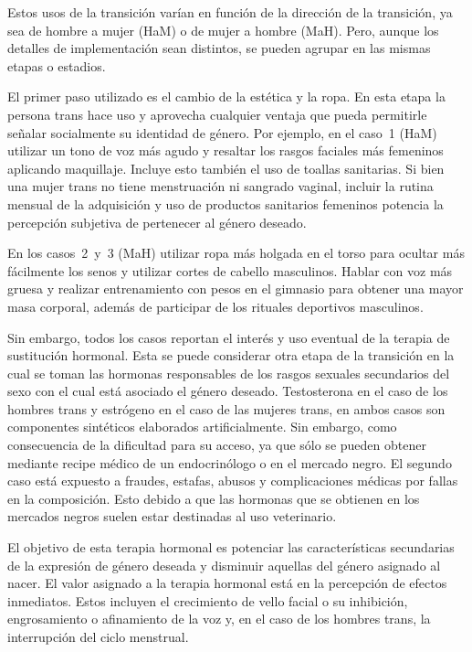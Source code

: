 Estos usos de la transición varían en función de la dirección de la transición,
ya sea de hombre a mujer (HaM) o de mujer a hombre (MaH). Pero, aunque los
detalles de implementación sean distintos, se pueden agrupar en las mismas
etapas o estadios.

El primer paso utilizado es el cambio de la estética y la ropa. En esta etapa la
persona trans hace uso y aprovecha cualquier ventaja que pueda permitirle
señalar socialmente su identidad de género. Por ejemplo, en el caso~1 (HaM)
utilizar un tono de voz más agudo y resaltar los rasgos faciales más femeninos
aplicando maquillaje. Incluye esto también el uso de toallas sanitarias. Si bien
una mujer trans no tiene menstruación ni sangrado vaginal, incluir la rutina
mensual de la adquisición y uso de productos sanitarios femeninos potencia la
percepción subjetiva de pertenecer al género deseado.

En los casos~2~y~3 (MaH) utilizar ropa más holgada en el torso para ocultar más
fácilmente los senos y utilizar cortes de cabello masculinos. Hablar con voz más
gruesa y realizar entrenamiento con pesos en el gimnasio para obtener una mayor
masa corporal, además de participar de los rituales deportivos masculinos.

Sin embargo, todos los casos reportan el interés y uso eventual de la terapia de
sustitución hormonal. Esta se puede considerar otra etapa de la transición en la
cual se toman las hormonas responsables de los rasgos sexuales secundarios del
sexo con el cual está asociado el género deseado. Testosterona en el caso de los
hombres trans y estrógeno en el caso de las mujeres trans, en ambos casos son
componentes sintéticos elaborados artificialmente. Sin embargo, como
consecuencia de la dificultad para su acceso, ya que sólo se pueden obtener
mediante recipe médico de un endocrinólogo o en el mercado negro. El segundo
caso está expuesto a fraudes, estafas, abusos y complicaciones médicas por
fallas en la composición. Esto debido a que las hormonas que se obtienen en los
mercados negros suelen estar destinadas al uso veterinario.

El objetivo de esta terapia hormonal es potenciar las características
secundarias de la expresión de género deseada y disminuir aquellas del género
asignado al nacer. El valor asignado a la terapia hormonal está en la percepción
de efectos inmediatos. Estos incluyen el crecimiento de vello facial o su
inhibición, engrosamiento o afinamiento de la voz y, en el caso de los hombres
trans, la interrupción del ciclo menstrual.

